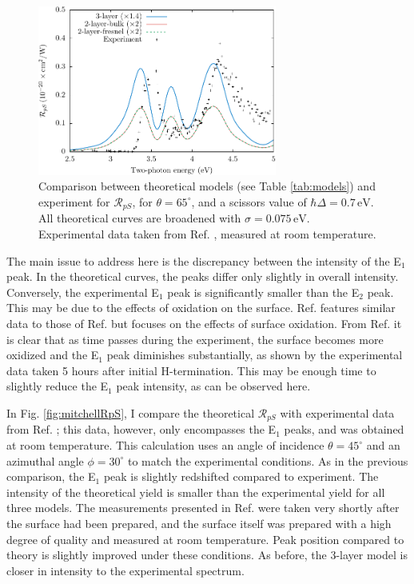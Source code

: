 \begin{figure}
\centering
\includegraphics[width=0.7\textwidth]{content/figures/fig-4_4_01}
\caption{Comparison between theoretical models (see Table \ref{tab:models}) and
experiment for $\mathcal{R}_{pS}$, for $\theta=65^{\circ}$, and a scissors
value of $\hbar\Delta = 0.7\,\text{eV}$. All theoretical curves are broadened
with $\sigma=0.075\,\text{eV}$. Experimental data taken from Ref.
\cite{mejiaPRB02}, measured at room temperature.}
\label{fig:RpS}
\end{figure}

The main issue to address here is the discrepancy between the intensity of the
E$_{1}$ peak. In the theoretical curves, the peaks differ only slightly in
overall intensity. Conversely, the experimental E$_{1}$ peak is significantly
smaller than the E$_{2}$ peak. This may be due to the effects of oxidation on
the surface. Ref. \cite{bergfeldPRL04} features similar data to those of Ref.
\cite{mejiaPRB02} but focuses on the effects of surface oxidation. From Ref.
\cite{bergfeldPRL04} it is clear that as time passes during the experiment, the
surface becomes more oxidized and the E$_{1}$ peak diminishes substantially, as
shown by the experimental data taken 5 hours after initial H-termination. This
may be enough time to slightly reduce the E$_{1}$ peak intensity, as can be
observed here.

In Fig. \ref{fig:mitchellRpS}, I compare the theoretical $\mathcal{R}_{pS}$ with
experimental data from Ref. \cite{mitchellSS01}; this data, however, only
encompasses the E$_{1}$ peaks, and was obtained at room temperature. This
calculation uses an angle of incidence $\theta=45^\circ$ and an azimuthal angle
$\phi=30^\circ$ to match the experimental conditions. As in the previous
comparison, the E$_{1}$ peak is slightly redshifted compared to experiment. The
intensity of the theoretical yield is smaller than the experimental yield for
all three models. The measurements presented in Ref. \cite{mitchellSS01} were
taken very shortly after the surface had been prepared, and the surface itself
was prepared with a high degree of quality and measured at room temperature.
Peak position compared to theory is slightly improved under these conditions. As
before, the 3-layer model is closer in intensity to the experimental spectrum.

